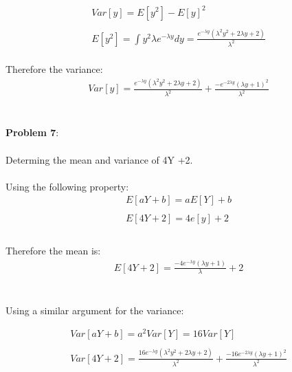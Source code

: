 \documentclass{exam}
\begin{document}
\begin{equation}
\begin{gathered}
Var[y] = E[y^2] - E[y]^2\\
\\
E[y^2] = \int y^2 \lambda e^{-\lambda y}dy = \frac{e^{-\lambda y}(\lambda^2 y^2 + 2\lambda y +2)}{\lambda^2}
\end{gathered}
\end{equation} 
\\
Therefore the variance:
\\
\begin{equation}
\begin{gathered}
Var[y] = \frac{e^{-\lambda y}(\lambda^2 y^2 + 2\lambda y +2)}{\lambda^2} + \frac{-e^{-2\lambda y}(\lambda y + 1)^2}{\lambda^2}
\end{gathered}
\end{equation} 
\\
\\
\noindent
\textbf{Problem 7}:
\\
\\
Determing the mean and variance of 4Y +2.
\\
\\
Using the following property: 
\begin{equation}
\begin{gathered}
E[aY + b] = aE[Y] +b\\
\\
E[4Y+2] = 4e[y] + 2\\
\end{gathered}
\end{equation} 
\\
Therefore the mean is: 
\begin{equation}
\begin{gathered}
E[4Y+2] = \frac{-4e^{-\lambda y}(\lambda y + 1)}{\lambda} +2
\end{gathered}
\end{equation} 
\\
\\
Using a similar argument for the variance: 

\begin{equation}
\begin{gathered}
Var[aY+b] = a^2Var[Y] = 16Var[Y]\\
\\
Var[4Y+2] =  \frac{16e^{-\lambda y}(\lambda^2 y^2 + 2\lambda y +2)}{\lambda^2} + \frac{-16e^{-2\lambda y}(\lambda y + 1)^2}{\lambda^2}
\end{gathered}
\end{equation}
\end{document}
